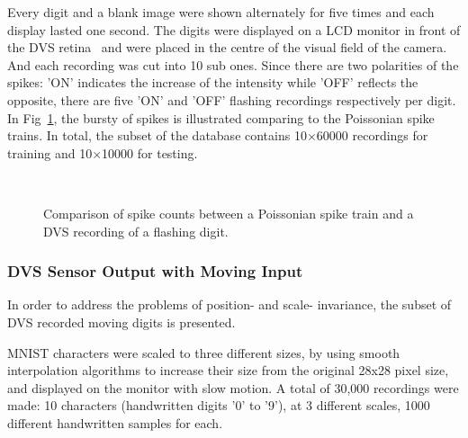 	Every digit and a blank image were shown alternately for five times and each display lasted one second.
	The digits were displayed on a LCD monitor in front of the DVS retina~\cite{serrano-gotarredona_128_2013} and were placed in the centre of the visual field of the camera.
	And each recording was cut into 10 sub ones.
	Since there are two polarities of the spikes: 'ON' indicates the increase of the intensity while 'OFF' reflects the opposite, there are five 'ON' and 'OFF' flashing recordings respectively per digit.
	In Fig~\ref{fig:count}, the bursty of spikes is illustrated comparing to the Poissonian spike trains.
	In total, the subset of the database contains 10$\times$60000 recordings for training and 10$\times$10000 for testing.
	\begin{figure}[b!]
	  \centering
	  \\

	  \caption{Comparison of spike counts between a Poissonian spike train and a DVS recording of a flashing digit.}
	  \label{fig:count}
	\end{figure}
	\subsubsection{DVS Sensor Output with Moving Input}
	In order to address the problems of position- and scale- invariance, the subset of DVS recorded moving digits is presented.
	
	MNIST characters were scaled to three different sizes, by using smooth interpolation algorithms to increase their size from the original 28x28 pixel size, and displayed on the monitor with slow motion. 
	A total of 30,000 recordings were made: 10 characters (handwritten digits '0' to '9'), at 3 different scales, 1000 different handwritten samples for each.